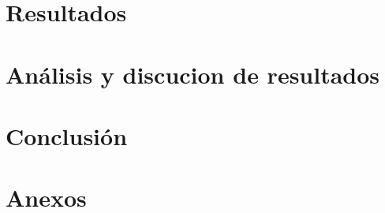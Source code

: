 \documentclass{article}
\begin{document}
\newpage

\section{Resultados}

\newpage

\section{Análisis y discucion de resultados}

\newpage

\section{Conclusión}

\newpage

\section{Anexos}

\newpage
\end{document}

